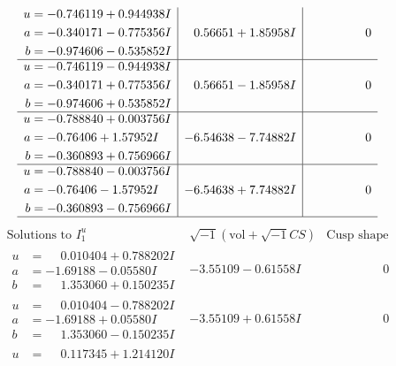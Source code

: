 \documentclass[1p]{elsarticle_modified}
\theoremstyle{definition}
\newcommand{\I}{\sqrt{-1}}
\begin{document}
$$\begin{array}{c|c|c}
\begin{aligned}
u &= -0.746119 + 0.944938 I \\
a &= -0.340171 - 0.775356 I \\
b &= -0.974606 - 0.535852 I\end{aligned}
 & \phantom{-}0.56651 + 1.85958 I & \phantom{-0.000000 } 0 \\ \hline\begin{aligned}
u &= -0.746119 - 0.944938 I \\
a &= -0.340171 + 0.775356 I \\
b &= -0.974606 + 0.535852 I\end{aligned}
 & \phantom{-}0.56651 - 1.85958 I & \phantom{-0.000000 } 0 \\ \hline\begin{aligned}
u &= -0.788840 + 0.003756 I \\
a &= -0.76406 + 1.57952 I \\
b &= -0.360893 + 0.756966 I\end{aligned}
 & -6.54638 - 7.74882 I & \phantom{-0.000000 } 0 \\ \hline\begin{aligned}
u &= -0.788840 - 0.003756 I \\
a &= -0.76406 - 1.57952 I \\
b &= -0.360893 - 0.756966 I\end{aligned}
 & -6.54638 + 7.74882 I & \phantom{-0.000000 } 0\\
 \hline 
 \end{array}$$\newpage$$\begin{array}{c|c|c}  
\text{Solutions to }I^u_{1}& \I (\text{vol} + \sqrt{-1}CS) & \text{Cusp shape}\\
 \hline 
\begin{aligned}
u &= \phantom{-}0.010404 + 0.788202 I \\
a &= -1.69188 - 0.05580 I \\
b &= \phantom{-}1.353060 + 0.150235 I\end{aligned}
 & -3.55109 - 0.61558 I & \phantom{-0.000000 } 0 \\ \hline\begin{aligned}
u &= \phantom{-}0.010404 - 0.788202 I \\
a &= -1.69188 + 0.05580 I \\
b &= \phantom{-}1.353060 - 0.150235 I\end{aligned}
 & -3.55109 + 0.61558 I & \phantom{-0.000000 } 0 \\ \hline\begin{aligned}
u &= \phantom{-}0.117345 + 1.214120 I \\

\end{aligned}
\end{array}$$
\end{document}
